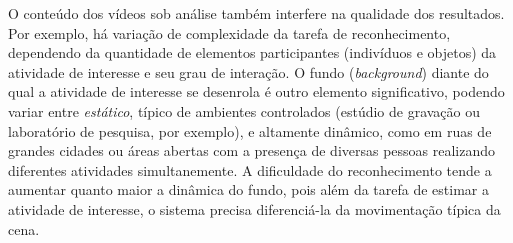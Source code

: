 %
O conteúdo dos vídeos sob análise também interfere na qualidade dos resultados. Por exemplo, há variação de complexidade da tarefa de reconhecimento, dependendo da quantidade de elementos participantes (indivíduos e objetos) da atividade de interesse e seu grau de interação.%
O fundo (\emph{background}) diante do qual a atividade de interesse se desenrola é outro elemento significativo, podendo variar entre \emph{estático}, típico de ambientes controlados (estúdio de gravação ou laboratório de pesquisa, por exemplo), e altamente dinâmico, como em ruas de grandes cidades ou áreas abertas com a presença de diversas pessoas realizando diferentes atividades simultanemente. A dificuldade do reconhecimento tende a aumentar quanto maior a dinâmica do fundo, pois além da tarefa de estimar a atividade de interesse, o sistema precisa diferenciá-la da movimentação típica da cena.
%
%

